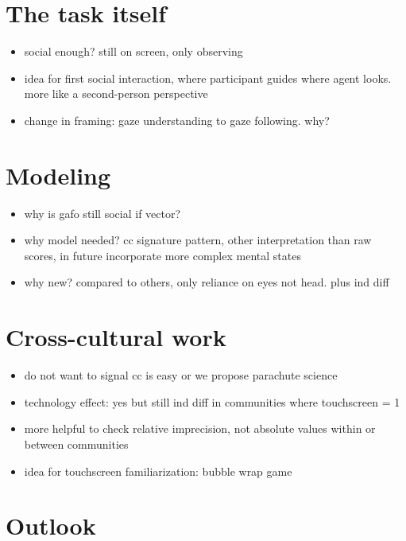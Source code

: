 \documentclass[
]{scrbook}
\providecommand{\tightlist}{%
  \setlength{\itemsep}{0pt}\setlength{\parskip}{0pt}}
\begin{document}
\section{The task itself}\label{the-task-itself}

\begin{itemize}
\tightlist
\item
  social enough? still on screen, only observing
\item
  idea for first social interaction, where participant guides where agent looks. more like a second-person perspective
\item
  change in framing: gaze understanding to gaze following. why?
\end{itemize}

\section{Modeling}\label{modeling}

\begin{itemize}
\tightlist
\item
  why is gafo still social if vector?
\item
  why model needed? cc signature pattern, other interpretation than raw scores, in future incorporate more complex mental states
\item
  why new? compared to others, only reliance on eyes not head. plus ind diff
\end{itemize}

\section{Cross-cultural work}\label{cross-cultural-work}

\begin{itemize}
\tightlist
\item
  do not want to signal cc is easy or we propose parachute science
\item
  technology effect: yes but still ind diff in communities where touchscreen = 1
\item
  more helpful to check relative imprecision, not absolute values within or between communities
\item
  idea for touchscreen familiarization: bubble wrap game
\end{itemize}

\section{Outlook}\label{outlook}
\end{document}
